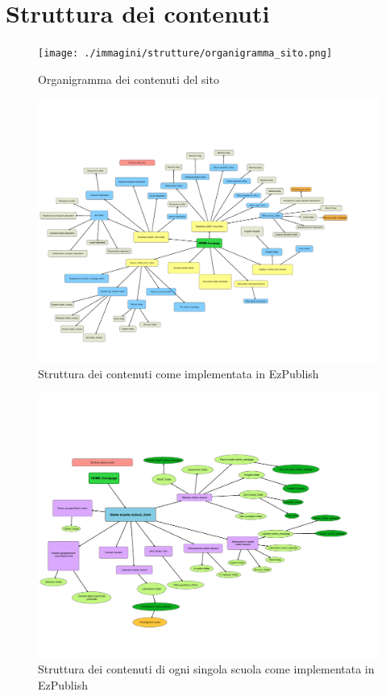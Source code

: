 \chapter[Strutture]{Struttura dei contenuti}

\begin{figure}
 \centering
 \texttt{[image: ./immagini/strutture/organigramma\_sito.png]}
 \caption{Organigramma dei contenuti del sito}
 \label{fig:strutt_1}
\end{figure}
\begin{figure}
 \centering
 \includegraphics[height=\textheight]{./immagini/strutture/struttura_isis.pdf}
\caption{Struttura dei contenuti come implementata in EzPublish} 
\label{fig:strutt_2}
\end{figure}
\begin{figure}
 \flushleft
 \includegraphics[height=\textheight]{./immagini/strutture/struttura_scuola.pdf}
\caption{Struttura dei contenuti di ogni singola scuola come implementata in EzPublish} 
\label{fig:strutt_scuola}
\end{figure}
